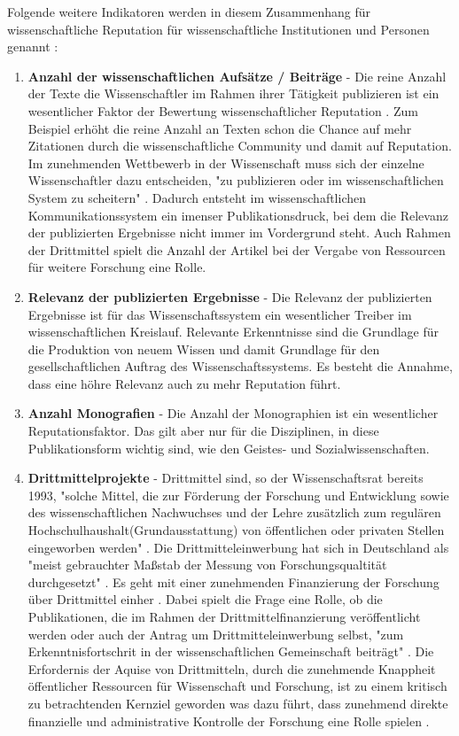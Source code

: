 Folgende weitere Indikatoren werden in diesem Zusammenhang für wissenschaftliche Reputation für wissenschaftliche Institutionen und Personen genannt \cite{hanekop_2008}:
\begin{enumerate}
\item \textbf{Anzahl der wissenschaftlichen Aufsätze / Beiträge} - Die reine Anzahl der Texte die Wissenschaftler im Rahmen ihrer Tätigkeit publizieren ist ein wesentlicher Faktor der Bewertung wissenschaftlicher Reputation \cite{luhmann_1970_selbststeuerung} \cite{CLAPHAM_2005}. Zum Beispiel erhöht die reine Anzahl an Texten schon die Chance auf mehr Zitationen durch die wissenschaftliche Community und damit auf Reputation. Im zunehmenden Wettbewerb in der Wissenschaft muss sich der einzelne Wissenschaftler dazu entscheiden, "zu publizieren oder im wissenschaftlichen System zu scheitern" \cite{Suess_2006}. Dadurch entsteht im wissenschaftlichen Kommunikationssystem ein imenser Publikationsdruck, bei dem die Relevanz der publizierten Ergebnisse nicht immer im Vordergrund steht\cite{suchen}. Auch Rahmen der Drittmittel spielt die Anzahl der Artikel bei der Vergabe von Ressourcen für weitere Forschung eine Rolle. \cite{suchen}
\item \textbf{Relevanz der publizierten Ergebnisse} - Die Relevanz der publizierten Ergebnisse ist für das Wissenschaftssystem ein wesentlicher Treiber im wissenschaftlichen Kreislauf. Relevante Erkenntnisse sind die Grundlage für die Produktion von neuem Wissen und damit Grundlage für den gesellschaftlichen Auftrag des Wissenschaftssystems. \cite{suchen} Es besteht die Annahme, dass eine höhre Relevanz auch zu mehr Reputation führt.
\item \textbf{Anzahl Monografien} - Die Anzahl der Monographien ist ein wesentlicher Reputationsfaktor. Das gilt aber nur für die Disziplinen, in diese Publikationsform wichtig sind, wie den Geistes- und Sozialwissenschaften.
\item \textbf{Drittmittelprojekte} - Drittmittel sind, so der Wissenschaftsrat bereits 1993, "solche Mittel, die zur Förderung der Forschung und Entwicklung sowie des wissenschaftlichen Nachwuchses und der Lehre zusätzlich zum regulären Hochschulhaushalt(Grundausstattung) von öffentlichen oder privaten Stellen eingeworben werden" \cite{wr_2014}. Die Drittmitteleinwerbung hat sich in Deutschland als "meist gebrauchter Maßstab der Messung von Forschungsqualtität durchgesetzt" \cite{M_nch_2006}. Es geht mit einer zunehmenden Finanzierung der Forschung über Drittmittel einher \cite{Neidhardt_2010} \cite{Jansen_2007} \cite{simon_2009_wissenschaft_governance}. Dabei spielt die Frage eine Rolle, ob die Publikationen, die im Rahmen der Drittmittelfinanzierung veröffentlicht werden oder auch der Antrag um Drittmitteleinwerbung selbst, "zum Erkenntnisfortschrit in der wissenschaftlichen Gemeinschaft beiträgt" \cite{M_nch_2006}. Die Erfordernis der Aquise von Drittmitteln, durch die zunehmende Knappheit öffentlicher Ressourcen für Wissenschaft und Forschung, ist zu einem kritisch zu betrachtenden Kernziel geworden \cite{Jansen_2007} was dazu führt, dass zunehmend direkte finanzielle und administrative Kontrolle der Forschung eine Rolle spielen \cite{Barl_sius_2008}.

\end{enumerate}
